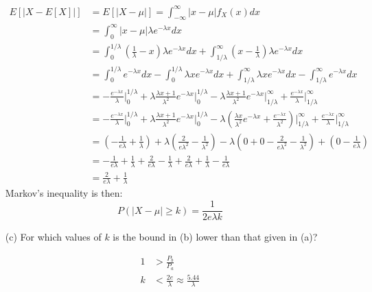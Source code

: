 \documentclass{article}
\newcommand{\1}{\mathbf{1}}
\begin{document}
\begin{enumerate}
    \begin{align*}
        E[|X - E[X]|] &= E[|X - \mu|] = \int_{-\infty}^\infty |x-\mu|f_X(x) dx \\
        &= \int_{0}^\infty |x-\mu|\lambda e^{-\lambda x} dx \\
        &= \int_0^{1/\lambda} \left(\frac{1}{\lambda} - x\right)\lambda e^{-\lambda x} dx 
            + \int_{1/\lambda}^\infty \left(x - \frac{1}{\lambda} \right)\lambda e^{-\lambda x} dx \\
        &= \int_0^{1/\lambda} e^{-\lambda x} dx 
            - \int_0^{1/\lambda} \lambda xe^{-\lambda x} dx
            + \int_{1/\lambda}^\infty \lambda  xe^{-\lambda x} dx 
            - \int_{1/\lambda}^\infty e^{-\lambda x} dx \\
        &= -\frac{e^{-\lambda x}}{\lambda} \bigg|_0^{1/\lambda} 
            + \lambda \frac{\lambda x+1}{\lambda^2}e^{-\lambda x} \bigg|_0^{1/\lambda}
            - \lambda \frac{\lambda x+1}{\lambda^2}e^{-\lambda x} \bigg|_{1/\lambda}^\infty 
            + \frac{e^{-\lambda x}}{\lambda} \bigg|_{1/\lambda}^\infty \\
        &= -\frac{e^{-\lambda x}}{\lambda} \bigg|_0^{1/\lambda} 
            + \lambda \frac{\lambda x+1}{\lambda^2}e^{-\lambda x} \bigg|_0^{1/\lambda}
            - \lambda \left(\frac{\lambda x}{\lambda^2}e^{-\lambda x} + \frac{e^{-\lambda x}}{\lambda^2} \right)\bigg|_{1/\lambda}^\infty 
            + \frac{e^{-\lambda x}}{\lambda} \bigg|_{1/\lambda}^\infty \\
        &= \left(-\frac{1}{e\lambda}+ \frac{1}{\lambda}\right) 
            + \lambda \left(\frac{2}{e\lambda^2} - \frac{1}{\lambda^2} \right) 
            - \lambda \left(0 + 0 - \frac{2}{e\lambda^2} - \frac{1}{\lambda^2}\right) 
            + \left(0 - \frac{1}{e\lambda}\right) \\
        &= -\frac{1}{e\lambda} + \frac{1}{\lambda} 
           + \frac{2}{e\lambda} - \frac{1}{\lambda}  
           + \frac{2}{e\lambda} + \frac{1}{\lambda} 
           - \frac{1}{e\lambda}\\
        &= \frac{2}{e\lambda} + \frac{1}{\lambda} 
    \end{align*}
    Markov's inequality is then:
    $$P(|X-\mu|\geq k) = \frac{1}{2 e \lambda k}$$

    \item[(c)] For which values of $k$ is the bound in (b) lower than that given in (a)?
    
    \begin{align*}
        1 &> \frac{P_b}{P_a}\\
        k &< \frac{2e}{\lambda} \approx \frac{5.44}{\lambda}
    \end{align*}
\end{enumerate}
\end{document}
